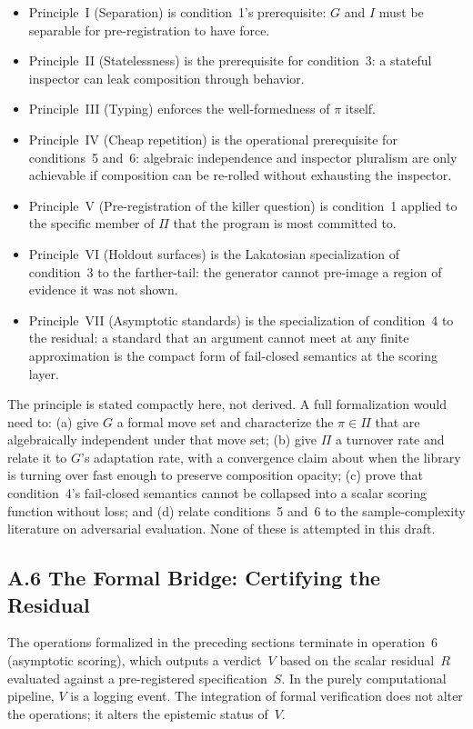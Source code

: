 \documentclass[11pt]{article}
\begin{document}
\begin{itemize}
\item Principle~I (Separation) is condition~1's prerequisite: $G$ and $I$ must be separable for pre-registration to have force.
\item Principle~II (Statelessness) is the prerequisite for condition~3: a stateful inspector can leak composition through behavior.
\item Principle~III (Typing) enforces the well-formedness of $\pi$ itself.
\item Principle~IV (Cheap repetition) is the operational prerequisite for conditions~5 and~6: algebraic independence and inspector pluralism are only achievable if composition can be re-rolled without exhausting the inspector.
\item Principle~V (Pre-registration of the killer question) is condition~1 applied to the specific member of $\Pi$ that the program is most committed to.
\item Principle~VI (Holdout surfaces) is the Lakatosian specialization of condition~3 to the farther-tail: the generator cannot pre-image a region of evidence it was not shown.
\item Principle~VII (Asymptotic standards) is the specialization of condition~4 to the residual: a standard that an argument cannot meet at any finite approximation is the compact form of fail-closed semantics at the scoring layer.
\end{itemize}

The principle is stated compactly here, not derived. A full formalization would need to: (a) give $G$ a formal move set and characterize the $\pi \in \Pi$ that are algebraically independent under that move set; (b) give $\Pi$ a turnover rate and relate it to $G$'s adaptation rate, with a convergence claim about when the library is turning over fast enough to preserve composition opacity; (c) prove that condition~4's fail-closed semantics cannot be collapsed into a scalar scoring function without loss; and (d) relate conditions~5 and~6 to the sample-complexity literature on adversarial evaluation. None of these is attempted in this draft.

\subsection{A.6 The Formal Bridge: Certifying the Residual}

The operations formalized in the preceding sections terminate in operation~6 (asymptotic scoring), which outputs a verdict~$V$ based on the scalar residual~$R$ evaluated against a pre-registered specification~$S$. In the purely computational pipeline, $V$ is a logging event. The integration of formal verification does not alter the operations; it alters the epistemic status of~$V$.
\end{document}
